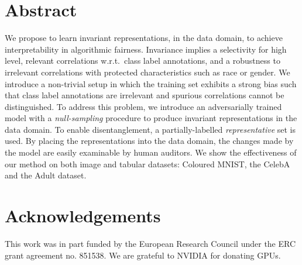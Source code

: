 \section{Abstract}
\noindent
We propose to learn invariant representations, in the data domain, to achieve interpretability in algorithmic fairness. 
Invariance implies a selectivity for high level, relevant correlations w.r.t.\ class label annotations, and a robustness to irrelevant correlations with protected characteristics such as race or gender. 
We introduce a non-trivial setup in which the training set exhibits a strong bias such that class label annotations are irrelevant and spurious correlations cannot be distinguished.
To address this problem, we introduce an adversarially trained model with a \emph{null-sampling} procedure to produce invariant representations in the data domain.
To enable disentanglement, a partially-labelled \emph{representative} set is used.
By placing the representations into the data domain, the changes made by the model are easily examinable by human auditors.
We show the effectiveness of our method on both image and tabular datasets: Coloured MNIST, the CelebA and the Adult dataset.%







\section*{Acknowledgements}
This work was in part funded by the European Research Council 
under the ERC grant agreement no. 851538.
We are grateful to NVIDIA for donating GPUs.




% 
